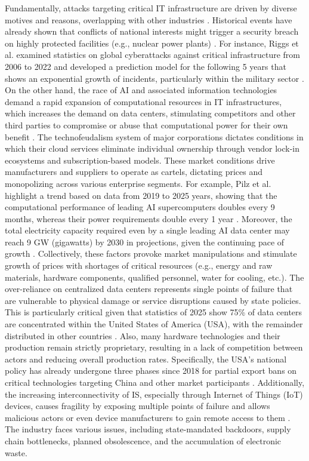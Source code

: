 Fundamentally, attacks targeting critical IT infrastructure are driven by diverse motives and reasons, overlapping with other industries \cite{lehto2022cyber}. Historical events have already shown that conflicts of national interests might trigger a security breach on highly protected facilities (e.g., nuclear power plants) \cite{makrakis2021industrial}. For instance, Riggs et al. examined statistics on global cyberattacks against critical infrastructure from 2006 to 2022 and developed a prediction model for the following 5 years that shows an exponential growth of incidents, particularly within the military sector \cite{riggs2023impact}. On the other hand, the race of AI and associated information technologies demand a rapid expansion of computational resources in IT infrastructures, which increases the demand on data centers, stimulating competitors and other third parties to compromise or abuse that computational power for their own benefit \cite{yigit2024critical}. The technofeudalism system of major corporations dictates conditions in which their cloud services eliminate individual ownership through vendor lock-in ecosystems and subscription-based models. These market conditions drive manufacturers and suppliers to operate as cartels, dictating prices and monopolizing across various enterprise segments. For example, Pilz et al. highlight a trend based on data from 2019 to 2025 years, showing that the computational performance of leading AI supercomputers doubles every 9 months, whereas their power requirements double every 1 year \cite[Sec. 3.2-3.3]{pilz2025trends}. Moreover, the total electricity capacity required even by a single leading AI data center may reach 9 GW (gigawatts) by 2030 in projections, given the continuing pace of growth \cite[Sec. 4.1-4.2]{pilz2025trends}. Collectively, these factors provoke market manipulations and stimulate growth of prices with shortages of critical resources (e.g., energy and raw materials, hardware components, qualified personnel, water for cooling, etc.). The over-reliance on centralized data centers represents single points of failure that are vulnerable to physical damage or service disruptions caused by state policies. This is particularly critical given that statistics of 2025 show 75\% of data centers are concentrated within the United States of America (USA), with the remainder distributed in other countries \cite[Sec. 3.6]{pilz2025trends}. Also, many hardware technologies and their production remain strictly proprietary, resulting in a lack of competition between actors and reducing overall production rates. Specifically, the USA's national policy has already undergone three phases since 2018 for partial export bans on critical technologies targeting China and other market participants \cite[Ch. 3]{yu2025blockade}. Additionally, the increasing interconnectivity of IS, especially through Internet of Things (IoT) devices, causes fragility by exposing multiple points of failure and allows malicious actors or even device manufacturers to gain remote access to them \cite{vardakis2024review,rauhala2022physical}. The industry faces various issues, including state-mandated backdoors, supply chain bottlenecks, planned obsolescence, and the accumulation of electronic waste.


